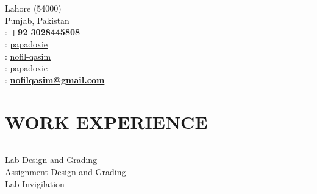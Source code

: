 \documentclass[]{resume}
\begin{document}
%
%

\hfill
\begin{minipage}[t]{0.66\textwidth}

    \vspace{-643pt}

    \hspace*{0pt}\hfill    \\
    \hspace*{0pt}\hfill    \\
    \hspace*{0pt}\hfill Lahore (54000) \\
    \hspace*{0pt}\hfill Punjab, Pakistan \\
    \hspace*{0pt}\hfill {}: \textbf{\href{tel:+923028445808}{+92 3028445808}} \\
    \hspace*{0pt}\hfill {}: \href{https://github.com/papadoxie}{papadoxie}\\
    \hspace*{0pt}\hfill {}: \href{https://linkedin.com/in/nofil-qasim}{nofil-qasim}\\
    \hspace*{0pt}\hfill {}: \href{https://stackoverflow.com/users/8430623/papadoxie}{papadoxie}\\
    \hspace*{0pt}\hfill {}: \textbf{\href{mailto:nofilqasim@gmail.com}{nofilqasim@gmail.com}}



    \vspace{-7.9pt}

    \section{WORK EXPERIENCE}
    \noindent\rule{12.5cm}{0.4pt}

     
    \noindent

    \vspace{-8pt}
    \hspace{5 em}
    \begin{minipage}{0.85\textwidth\vspace{2pt}}
        Lab Design and Grading\\
        Assignment Design and Grading\\
        Lab Invigilation
    \end{minipage}


\end{minipage}
\end{document}
